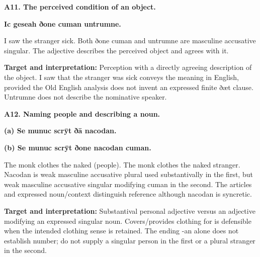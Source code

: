 \par\begin{minipage}{\linewidth}\raggedright
\textbf{A11. The perceived condition of an object.}

\textbf{Ic geseah ðone cuman untrumne.}

I saw the stranger sick. Both ðone cuman and untrumne are masculine accusative singular. The adjective describes the perceived object and agrees with it.

\textbf{Target and interpretation:} Perception with a directly agreeing description of the object. I saw that the stranger was sick conveys the meaning in English, provided the Old English analysis does not invent an expressed finite ðæt clause. Untrumne does not describe the nominative speaker.

\end{minipage}\par\addvspace{4pt}

\par\begin{minipage}{\linewidth}\raggedright
\textbf{A12. Naming people and describing a noun.}

\textbf{(a) Se munuc scrȳt ðā nacodan.}

\textbf{(b) Se munuc scrȳt ðone nacodan cuman.}

The monk clothes the naked (people). The monk clothes the naked stranger. Nacodan is weak masculine accusative plural used substantivally in the first, but weak masculine accusative singular modifying cuman in the second. The articles and expressed noun/\allowbreak{}context distinguish reference although nacodan is syncretic.

\textbf{Target and interpretation:} Substantival personal adjective versus an adjective modifying an expressed singular noun. Covers/\allowbreak{}provides clothing for is defensible when the intended clothing sense is retained. The ending -an alone does not establish number; do not supply a singular person in the first or a plural stranger in the second.

\end{minipage}\par\addvspace{4pt}

